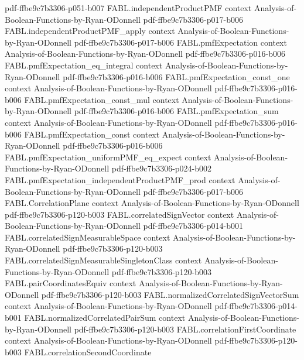 \begin{theorem}
{    pdf-ffbe9c7b3306-p051-b007}
\proofstep
  {FABL.independentProductPMF}
  {context}
  {Analysis-of-Boolean-Functions-by-Ryan-ODonnell}
  {pdf-ffbe9c7b3306-p017-b006}
\proofstep
  {FABL.independentProductPMF_apply}
  {context}
  {Analysis-of-Boolean-Functions-by-Ryan-ODonnell}
  {pdf-ffbe9c7b3306-p017-b006}
\proofstep
  {FABL.pmfExpectation}
  {context}
  {Analysis-of-Boolean-Functions-by-Ryan-ODonnell}
  {pdf-ffbe9c7b3306-p016-b006}
\proofstep
  {FABL.pmfExpectation_eq_integral}
  {context}
  {Analysis-of-Boolean-Functions-by-Ryan-ODonnell}
  {pdf-ffbe9c7b3306-p016-b006}
\proofstep
  {FABL.pmfExpectation_const_one}
  {context}
  {Analysis-of-Boolean-Functions-by-Ryan-ODonnell}
  {pdf-ffbe9c7b3306-p016-b006}
\proofstep
  {FABL.pmfExpectation_const_mul}
  {context}
  {Analysis-of-Boolean-Functions-by-Ryan-ODonnell}
  {pdf-ffbe9c7b3306-p016-b006}
\proofstep
  {FABL.pmfExpectation_sum}
  {context}
  {Analysis-of-Boolean-Functions-by-Ryan-ODonnell}
  {pdf-ffbe9c7b3306-p016-b006}
\proofstep
  {FABL.pmfExpectation_const}
  {context}
  {Analysis-of-Boolean-Functions-by-Ryan-ODonnell}
  {pdf-ffbe9c7b3306-p016-b006}
\proofstep
  {FABL.pmfExpectation_uniformPMF_eq_expect}
  {context}
  {Analysis-of-Boolean-Functions-by-Ryan-ODonnell}
  {pdf-ffbe9c7b3306-p024-b002}
\proofstep
  {FABL.pmfExpectation_independentProductPMF_prod}
  {context}
  {Analysis-of-Boolean-Functions-by-Ryan-ODonnell}
  {pdf-ffbe9c7b3306-p017-b006}
\proofstep
  {FABL.CorrelationPlane}
  {context}
  {Analysis-of-Boolean-Functions-by-Ryan-ODonnell}
  {pdf-ffbe9c7b3306-p120-b003}
\proofstep
  {FABL.correlatedSignVector}
  {context}
  {Analysis-of-Boolean-Functions-by-Ryan-ODonnell}
  {pdf-ffbe9c7b3306-p014-b001}
\proofstep
  {FABL.correlatedSignMeasurableSpace}
  {context}
  {Analysis-of-Boolean-Functions-by-Ryan-ODonnell}
  {pdf-ffbe9c7b3306-p120-b003}
\proofstep
  {FABL.correlatedSignMeasurableSingletonClass}
  {context}
  {Analysis-of-Boolean-Functions-by-Ryan-ODonnell}
  {pdf-ffbe9c7b3306-p120-b003}
\proofstep
  {FABL.pairCoordinatesEquiv}
  {context}
  {Analysis-of-Boolean-Functions-by-Ryan-ODonnell}
  {pdf-ffbe9c7b3306-p120-b003}
\proofstep
  {FABL.normalizedCorrelatedSignVectorSum}
  {context}
  {Analysis-of-Boolean-Functions-by-Ryan-ODonnell}
  {pdf-ffbe9c7b3306-p014-b001}
\proofstep
  {FABL.normalizedCorrelatedPairSum}
  {context}
  {Analysis-of-Boolean-Functions-by-Ryan-ODonnell}
  {pdf-ffbe9c7b3306-p120-b003}
\proofstep
  {FABL.correlationFirstCoordinate}
  {context}
  {Analysis-of-Boolean-Functions-by-Ryan-ODonnell}
  {pdf-ffbe9c7b3306-p120-b003}
\proofstep
  {FABL.correlationSecondCoordinate}

\end{theorem}
